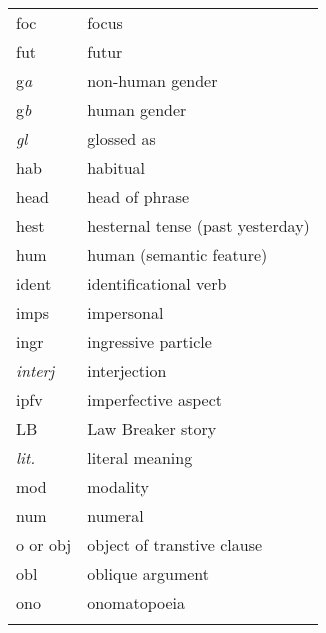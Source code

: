 \begin{xtabular}{ll}
 {\sc foc} & focus \\
{\sc fut} &  futur\\


{\sc g}{\it a} & non-human gender  \\
{\sc g}{\it b} &  human gender\\
{\it gl} & glossed as\\

{\sc hab} & habitual \\ %
{\sc head} & head of phrase \\ %
 {\sc hest} & hesternal tense (past yesterday) \\
 {\sc hum} & human   (semantic feature)\\

{\sc ident} & identificational verb\\ %
{\sc imps} & impersonal\\ %
{\sc ingr} & ingressive particle\\
{\it interj} & interjection\\ %
{\sc ipfv} &  imperfective aspect\\%


LB  & Law Breaker story\\
{\it lit.} & literal meaning\\

 {\sc mod} &  modality \\

{\sc num} &  numeral\\ %

{\sc o} or {\sc obj} & object of transtive clause\\
{\sc obl} & oblique argument\\
 {\sc ono} & onomatopoeia \\



\thispagestyle{plain}


\end{xtabular}
